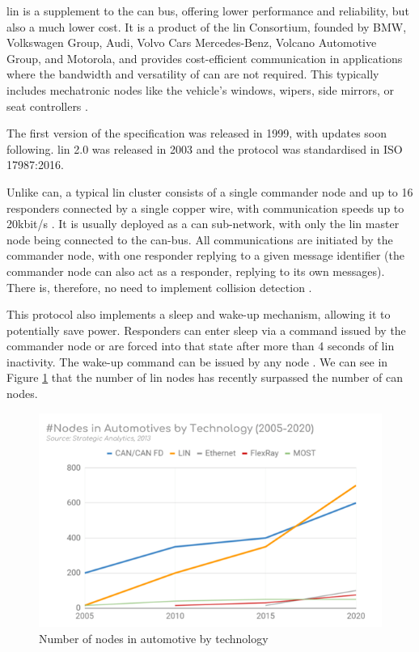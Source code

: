\gls{lin} is a supplement to the \gls{can} bus, offering lower performance and reliability, but also a much lower cost. It is a product of the \gls{lin} Consortium, founded by BMW, Volkswagen Group, Audi, Volvo Cars Mercedes-Benz, Volcano Automotive Group, and Motorola, and provides cost-efficient communication in applications where the bandwidth and versatility of \gls{can} are not required. This typically includes mechatronic nodes like the vehicle’s windows, wipers, side mirrors, or seat controllers \citep{LIN}.\par
The first version of the specification was released in 1999, with updates soon following. \gls{lin} 2.0 was released in 2003 and the protocol was standardised in ISO 17987:2016.\par
Unlike \gls{can}, a typical \gls{lin} cluster consists of a single commander node and up to 16 responders connected by a single copper wire, with communication speeds up to 20kbit/s \citep{Takahashi2017}. It is usually deployed as a \gls{can} sub-network, with only the \gls{lin} master node being connected to the \gls{can}-bus. All communications are initiated by the commander node, with one responder replying to a given message identifier (the commander node can also act as a responder, replying to its own messages). There is, therefore, no need to implement collision detection \citep{LIN_CSS}.\par
This protocol also implements a sleep and wake-up mechanism, allowing it to potentially save power. Responders can enter sleep via a command issued by the commander node or are forced into that state after more than 4 seconds of \gls{lin} inactivity. The wake-up command can be issued by any node \citep{LIN}.
We can see in Figure \ref{fig:auto_nodes} that the number of \gls{lin} nodes has recently surpassed the number of \gls{can} nodes.

\begin{figure}
    \centering
    \includegraphics{img/parts/introduction/LIN Nodes.png}
    \caption{Number of nodes in automotive by technology \citep{LIN_CSS}}
    \label{fig:auto_nodes}
\end{figure}

